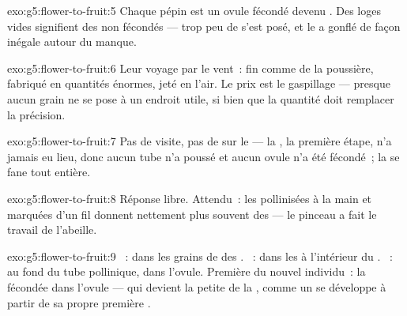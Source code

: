 \begin{solution}{exo:g5:flower-to-fruit:5}
Chaque pépin est un ovule fécondé devenu . Des loges vides
signifient des  non fécondés --- trop peu de  s'est
posé, et le  a gonflé de façon inégale autour du manque.
\end{solution}

\begin{solution}{exo:g5:flower-to-fruit:6}
Leur  voyage par le vent~: fin comme de la poussière,
fabriqué en quantités énormes, jeté en l'air. Le prix est le
gaspillage --- presque aucun grain ne se pose à un endroit utile,
si bien que la quantité doit remplacer la précision.
\end{solution}

\begin{solution}{exo:g5:flower-to-fruit:7}
Pas de visite, pas de  sur le  --- la , la
première étape, n'a jamais eu lieu, donc aucun tube n'a poussé et
aucun ovule n'a été fécondé~; la  se fane tout entière.
\end{solution}

\begin{solution}{exo:g5:flower-to-fruit:8}
Réponse libre. Attendu~: les  pollinisées à la main et
marquées d'un fil donnent nettement plus souvent des  --- le
pinceau a fait le travail de l'abeille.
\end{solution}

\begin{solution}{exo:g5:flower-to-fruit:9}
~: dans les grains de  des . ~: dans les  à l'intérieur du . ~: au
fond du tube pollinique, dans l'ovule. Première  du nouvel
individu~: la  fécondée dans l'ovule --- qui devient la
petite  de la , comme un  se développe à partir de
sa propre première .
\end{solution}

